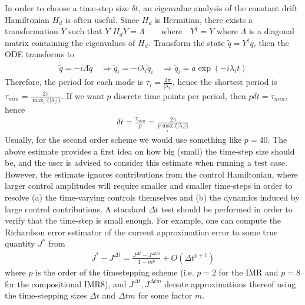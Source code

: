 \documentclass[11pt]{article}
\begin{document}
    In order to choose a time-step size $\delta t$, an eigenvalue analysis of
    the constant drift Hamiltonian $H_d$ is often useful. Since $H_d$ is Hermitian, there exists a transformation $Y$ such that $Y^{\dagger}H_d Y = \Lambda \qquad  \text{where} \quad Y^{\dagger} = Y$ where $\Lambda$ is a diagonal matrix containing the eigenvalues of $H_d$.
       Transform the state $\tilde q = Y^{\dagger} q$, then the ODE transforms to 
       \begin{align*}
         \dot \tilde q = -i \Lambda \tilde q \quad \Rightarrow \dot \tilde q_i =
         -i\lambda_i \tilde q_i \quad \Rightarrow \tilde q_i = a
         \exp(-i\lambda_i t)
       \end{align*}
       Therefore, the period for each mode is $\tau_i =
       \frac{2\pi}{|\lambda_i|}$, hence the shortest period is $\tau_{min} =
       \frac{2\pi}{\max_i\{|\lambda_i|\}}$. If we want $p$ discrete time points
       per period, then $p\delta t = \tau_{min}$, hence 
       \begin{align} \label{eq:timestepsize}
         \delta t = \frac{\tau_{min}}{p} = \frac{2\pi}{p\max_i\{|\lambda_i|\}}
       \end{align}
       Usually, for the second order scheme we would use something like $p=40$. The above estimate provides a first idea on how big (small) the time-step size should be, and the user is advised to consider this estimate when running a test case. However, the estimate ignores contributions from the control Hamiltonian, where larger control amplitudes will require smaller and smaller time-steps in order to resolve (a) the time-varying controls themselves and (b) the dynamics induced by large control contributions. A standard $\Delta t$ test should be performed in order to verify that the time-step is small enough. For example, one can compute the Richardson error estimator of the current approximation error to some true quantity $J^*$ from
       \begin{align}
         J^* - J^{\Delta t} = \frac{J^{\Delta t} - J^{\Delta t m}}{1-m^p} + O(\Delta t^{p+1})
       \end{align}
       where $p$ is the order of the timestepping scheme (i.e. $p=2$ for the IMR and $p=8$ for the compositional IMR8), and $J^{\Delta t}, J^{\Delta tm}$ denote approximations thereof using the time-stepping sizes $\Delta t$ and $\Delta t m$ for some factor $m$.        
       
\end{document}
